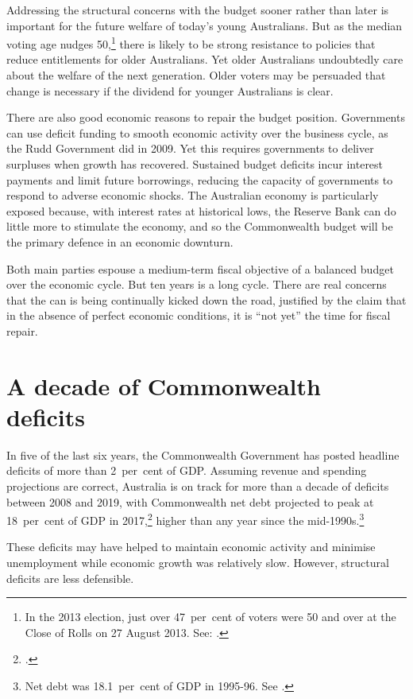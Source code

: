 \documentclass[twoside,english]{palatinob5portrait}
\begin{document}
Addressing the structural concerns with the budget sooner rather than later is important for the future welfare of today’s young Australians. But as the median voting age nudges 50,\footnote{In the 2013 election, just over 47~per~cent of voters were 50 and over at the Close of Rolls on 27 August 2013. See: \textcite{AEC2013}.}  there is likely to be strong resistance to policies that reduce entitlements for older Australians. Yet older Australians undoubtedly care about the welfare of the next generation. Older voters may be persuaded that change is necessary if the dividend for younger Australians is clear. 

There are also good economic reasons to repair the budget position. Governments can use deficit funding to smooth economic activity over the business cycle, as the Rudd Government did in 2009. Yet this requires governments to deliver surpluses when growth has recovered. Sustained budget deficits incur interest payments and limit future borrowings, reducing the capacity of governments to respond to adverse economic shocks. The Australian economy is particularly exposed because, with interest rates at historical lows, the Reserve Bank can do little more to stimulate the economy, and so the Commonwealth budget will be the primary defence in an economic downturn. 

Both main parties espouse a medium-term fiscal objective of a balanced budget over the economic cycle. But ten years is a long cycle. There are real concerns that the can is being continually kicked down the road, justified by the claim that in the absence of perfect economic conditions, it is “not yet” the time for fiscal repair.
\cleardoubleevenstandardpage
\@openrighttrue\makeatother
\chapter{A decade of Commonwealth deficits}\label{chapter:FISCAL-2}
In five of the last six years, the Commonwealth Government has posted headline deficits of more than 2~per~cent of GDP\@. Assuming revenue and spending projections are correct, Australia is on track for more than a decade of deficits between 2008 and 2019, with Commonwealth net debt projected to peak at 18~per~cent of GDP in 2017,\footcite[][3--9]{Treasury2015BudgetPapers201516}  higher than any year since the mid-1990s.\footnote{Net debt was 18.1~per~cent of GDP in 1995-96. See \textcite[][273]{Treasury2014-MYEFO-2014-15}.}

These deficits may have helped to maintain economic activity and minimise unemployment while economic growth was relatively slow. However, structural deficits are less defensible. 
\end{document}
